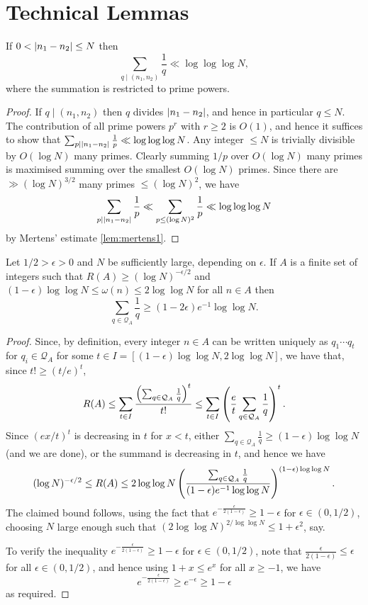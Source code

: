 \chapter{Technical Lemmas}
\label{chap:techlemmas}


\begin{lemma}
  \label{lem:basic}
  \leanok
  If $0<\left\lvert n_1-n_2\right\rvert\leq N$ then
  \[\sum_{q\mid (n_1,n_2)}\frac{1}{q}\ll \log\log\log N,\]
  where the summation is restricted to prime powers.
\end{lemma}
\begin{proof}
  \leanok
  If $q\mid (n_1,n_2)$ then $q$ divides $\left\lvert n_1-n_2\right\rvert$, and hence in particular $q\leq N$. The contribution of all prime powers $p^r$ with $r\geq 2$ is $O(1)$, and hence it suffices to show that $\sum_{p\mid \left\lvert n_1-n_2\right\rvert}\frac{1}{p}\ll \log\log\log N$. Any integer $\leq N$ is trivially divisible by $O(\log N)$ many primes. Clearly summing $1/p$ over $O(\log N)$ many primes is maximised summing over the smallest $O(\log N)$ primes. Since there are $\gg (\log N)^{3/2}$ many primes $\leq (\log N)^2$, we have
  \[\sum_{p\mid \left\lvert n_1-n_2\right\rvert}\frac{1}{p}\ll \sum_{p\leq (\log N)^2}\frac{1}{p}\ll \log\log\log N\]
  by Mertens' estimate \ref{lem:mertens1}.
\end{proof}

\begin{lemma}\label{lem:rtop}
Let $1/2>\epsilon>0$ and $N$ be sufficiently large, depending on $\epsilon$. If $A$ is a finite set of integers such that $R(A)\geq (\log N)^{-\epsilon/2}$ and $(1-\epsilon)\log\log N\leq \omega(n)\leq  2\log\log N$ for all $n\in A$ then
\[\sum_{q\in\mathcal{Q}_A}\frac{1}{q} \geq (1-2\epsilon)e^{-1}\log\log N.\]
\leanok
{}
\end{lemma}
\begin{proof}
  \leanok
Since, by definition, every integer $n\in A$ can be written uniquely as $q_1\cdots q_t$ for $q_i\in \mathcal{Q}_A$ for some $t\in I = [(1-\epsilon)\log\log N, 2\log\log N]$, we have that, since $t!\geq (t/e)^t$,
\[R(A)\leq  \sum_{t\in I}\frac{\left( \sum_{q\in \mathcal{Q}_A}\frac{1}{q}\right)^t}{t!}\leq \sum_{t\in I}\left( \frac{e}{t}\sum_{q\in \mathcal{Q}_A}\frac{1}{q}\right)^t.\]
Since $(ex/t)^t$ is decreasing in $t$ for $x<t$, either $\sum_{q\in \mathcal{Q}_A}\frac{1}{q}\geq (1-\epsilon)\log\log N$ (and we are done), or the summand is decreasing in $t$, and hence we have
\[(\log N)^{-\epsilon/2}\leq R(A)\leq 2\log\log N\left( \frac{\sum_{q\in \mathcal{Q}_A}\frac{1}{q}}{(1-\epsilon)e^{-1}\log\log N}\right)^{(1-\epsilon)\log\log N}.\]
The claimed bound follows, using the fact that $e^{-\frac{\epsilon}{2(1-\epsilon)}}\geq 1-\epsilon$ for $\epsilon\in (0,1/2)$, choosing $N$ large enough such that $(2\log\log N)^{2/\log\log N}\leq 1+\epsilon^2$, say.

To verify the inequality $e^{-\frac{\epsilon}{2(1-\epsilon)}}\geq 1-\epsilon$ for $\epsilon\in (0,1/2)$, note that $\frac{\epsilon}{2(1-\epsilon)}\leq \epsilon$ for all $\epsilon\in (0,1/2)$, and hence using $1+x\leq e^{x}$ for all $x\geq -1$, we have
\[e^{-\frac{\epsilon}{2(1-\epsilon)}}\geq e^{-\epsilon}\geq 1-\epsilon\]
as required.
\end{proof}


